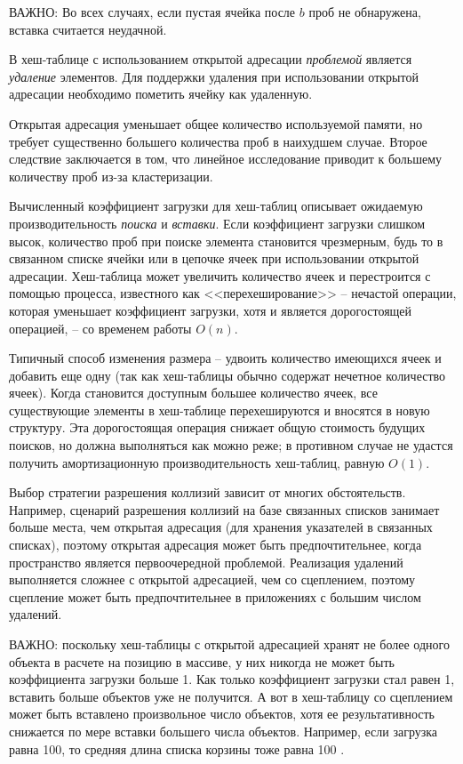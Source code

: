\documentclass[%
	11pt,
	a4paper,
	utf8,
		]{article}
\begin{document}
ВАЖНО: Во всех случаях, если пустая ячейка после $ b $ проб не обнаружена, вставка считается неудачной.

В хеш-таблице с использованием открытой адресации \emph{проблемой} является \emph{удаление} элементов. Для поддержки удаления при использовании открытой адресации необходимо пометить ячейку как удаленную.

Открытая адресация уменьшает общее количество используемой памяти, но требует существенно большего количества проб в наихудшем случае. Второе следствие заключается в том, что линейное исследование приводит к большему количеству проб из-за кластеризации.

Вычисленный коэффициент загрузки для хеш-таблиц описывает ожидаемую производительность \emph{поиска} и \emph{вставки}. Если коэффициент загрузки слишком высок, количество проб при поиске элемента становится чрезмерным, будь то в связанном списке ячейки или в цепочке ячеек при использовании открытой адресации. Хеш-таблица может увеличить количество ячеек и перестроится с помощью процесса, известного как <<перехеширование>> -- нечастой операции, которая уменьшает коэффициент загрузки, хотя и является дорогостоящей операцией, -- со временем работы $ O(n) $.

Типичный способ изменения размера -- удвоить количество имеющихся ячеек и добавить еще одну (так как хеш-таблицы обычно содержат нечетное количество ячеек). Когда становится доступным большее количество ячеек, все существующие элементы в хеш-таблице перехешируются и вносятся в новую структуру. Эта дорогостоящая операция снижает общую стоимость будущих поисков, но должна выполняться как можно реже; в противном случае не удастся получить амортизационную производительность хеш-таблиц, равную $ O(1) $. 

Выбор стратегии разрешения коллизий зависит от многих обстоятельств. Например, сценарий разрешения коллизий на базе связанных списков занимает больше места, чем открытая адресация (для хранения указателей в связанных списках), поэтому открытая адресация может быть предпочтительнее, когда пространство является первоочередной проблемой. Реализация удалений выполняется сложнее с открытой адресацией, чем со сцеплением, поэтому сцепление может быть предпочтительнее в приложениях с большим числом удалений.

ВАЖНО: поскольку хеш-таблицы с открытой адресацией хранят не более одного объекта в расчете на позицию в массиве, у них никогда не может быть коэффициента загрузки больше 1. Как только коэффициент загрузки стал равен 1, вставить больше объектов уже не получится. А вот в хеш-таблицу со сцеплением может быть вставлено произвольное число объектов, хотя ее результативность снижается по мере вставки большего числа объектов. Например, если загрузка равна 100, то средняя длина списка корзины тоже равна 100 \cite{ramalho:python-2016}.
\end{document}
